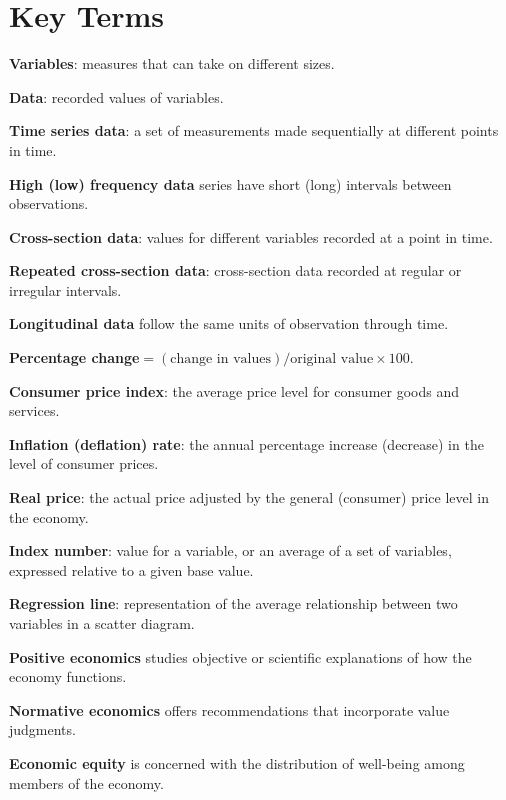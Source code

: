 \newpage
	\section*{Key Terms}
\begin{keyterms}
\textbf{Variables}: measures that can take on different sizes.

\textbf{Data}: recorded values of variables.

\textbf{Time series data}: a set of measurements made sequentially at different points in time.

\textbf{High (low) frequency data} series have short (long) intervals between observations.

\textbf{Cross-section data}: values for different variables recorded at a point in time.

\textbf{Repeated cross-section data}: cross-section data recorded at regular or irregular intervals.

\textbf{Longitudinal data} follow the same units of observation through time.

\textbf{Percentage change}$=(\text{change in values})/\text{original value}\times 100$.

\textbf{Consumer price index}: the average price level for consumer goods and services.

\textbf{Inflation (deflation) rate}: the annual percentage increase (decrease) in the level of consumer prices.

\textbf{Real price}: the actual price adjusted by the general (consumer) price level in the economy.

\textbf{Index number}: value for a variable, or an average of a set of variables, expressed relative to a given base value.

\textbf{Regression line}: representation of the average relationship between two variables in a scatter diagram.

\textbf{Positive economics} studies objective or scientific explanations of how the economy functions.

\textbf{Normative economics} offers recommendations that incorporate value judgments.

\textbf{Economic equity} is concerned with the distribution of well-being among members of the economy.
\end{keyterms}